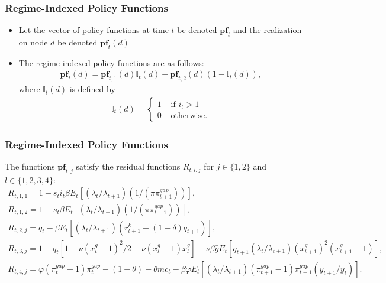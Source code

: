 \documentclass[11pt]{beamer}
\begin{document}
\begin{frame}\frametitle{Regime-Indexed Policy Functions}
\begin{itemize}\setlength{\itemsep}{10pt}
\item <1-|handout:1>Let the vector of policy functions at time $t$ be denoted $\textbf{pf}_t$ and the realization on node $d$ be denoted $\textbf{pf}_t(d)$
\item <2-|handout:1>The regime-indexed policy functions are as follows: 
\begin{gather*}
  \textbf{pf}_t(d) = \textbf{pf}_{t,1}(d)\mathds{I}_t(d) + \textbf{pf}_{t,2}(d)(1-\mathds{I}_t(d)),
\end{gather*}
where $\mathds{I}_t(d)$ is defined by 
\begin{gather*}
  \mathds{I}_t(d) = 
\begin{cases}
     1 &\text{ if } i_t > 1\\
     0 &\text{ otherwise.}
\end{cases}
\end{gather*}
\end{itemize}
\end{frame}
\begin{frame}\frametitle{Regime-Indexed Policy Functions}
The functions $\textbf{pf}_{t,j}$ satisfy the residual functions $R_{t,l,j}$ for $j \in\{1,2\}$ and $l \in \{1,2,3,4\}$: %
\scriptsize
\begin{gather*}
  R_{t,1,1} = 1 - s_ti_t\beta E_t[(\lambda_t/\lambda_{t+1})(1/(\bar{\pi}\pi_{t+1}^{gap}))],\\
  R_{t,1,2} = 1 - s_t\beta E_t[(\lambda_t/\lambda_{t+1})(1/(\bar{\pi}\pi_{t+1}^{gap}))],\\
R_{t,2,j} = q_t - \beta E_t[(\lambda_t/\lambda_{t+1})(r^k_{t+1}+(1-\delta)q_{t+1})],\\
    R_{t,3,j} = 1 - q_t[1-\nu(x^g_t-1)^2/2 - \nu(x_t^g-1)x_t^g] - \nu\beta\bar{g}E_t[q_{t+1}(\lambda_t/\lambda_{t+1})(x^g_{t+1})^2(x^g_{t+1}-1)], \\
    R_{t,4,j} = \varphi(\pi_t^{gap}-1)\pi_t^{gap} - (1-\theta) - \theta mc_t - \beta\varphi E_t[(\lambda_t/\lambda_{t+1})(\pi_{t+1}^{gap}-1)\pi_{t+1}^{gap}(y_{t+1}/y_t)].
  \end{gather*}
\normalfont
\end{frame}
\end{document}
